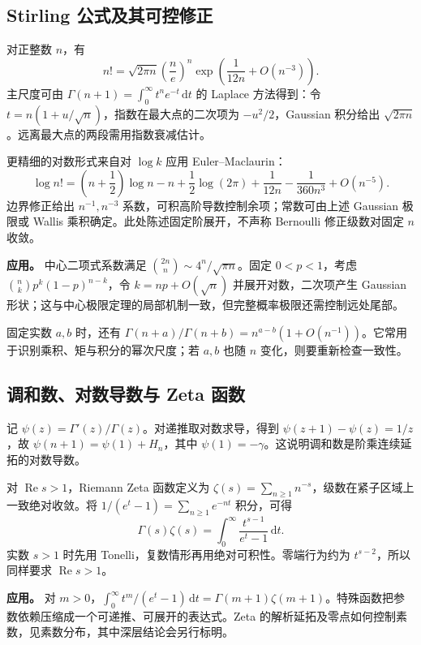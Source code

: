 \documentclass[12pt,fontset=fandol]{ctexart}
\begin{document}
\subsection{Stirling 公式及其可控修正}

\label{app:special-stirling}

对正整数 $n$，有
\[
n!=\sqrt{2\pi n}\left(\frac ne\right)^n
\exp\!\left(\frac1{12n}+O(n^{-3})\right).
\]
主尺度可由 $\Gamma(n+1)=\int_0^\infty t^ne^{-t}\,\mathrm dt$ 的 Laplace 方法得到：令 $t=n(1+u/\sqrt n)$，指数在最大点的二次项为 $-u^2/2$，Gaussian 积分给出 $\sqrt{2\pi n}$。远离最大点的两段需用指数衰减估计。

更精细的对数形式来自对 $\log k$ 应用 Euler--Maclaurin：
\[
\log n!=\left(n+\frac12\right)\log n-n+\frac12\log(2\pi)
+\frac1{12n}-\frac1{360n^3}+O(n^{-5}).
\]
边界修正给出 $n^{-1},n^{-3}$ 系数，可积高阶导数控制余项；常数可由上述 Gaussian 极限或 Wallis 乘积确定。此处陈述固定阶展开，不声称 Bernoulli 修正级数对固定 $n$ 收敛。

\textbf{应用。} 中心二项式系数满足 $\binom{2n}{n}\sim4^n/\sqrt{\pi n}$。固定 $0<p<1$，考虑 $\binom{n}{k}p^k(1-p)^{n-k}$，令 $k=np+O(\sqrt n)$ 并展开对数，二次项产生 Gaussian 形状；这与中心极限定理的局部机制一致，但完整概率极限还需控制远处尾部。

固定实数 $a,b$ 时，还有 $\Gamma(n+a)/\Gamma(n+b)=n^{a-b}(1+O(n^{-1}))$。它常用于识别乘积、矩与积分的幂次尺度；若 $a,b$ 也随 $n$ 变化，则要重新检查一致性。

\subsection{调和数、对数导数与 Zeta 函数}

\label{app:special-zeta}

记 $\psi(z)=\Gamma'(z)/\Gamma(z)$。对递推取对数求导，得到 $\psi(z+1)-\psi(z)=1/z$，故 $\psi(n+1)=\psi(1)+H_n$，其中 $\psi(1)=-\gamma$。这说明调和数是阶乘连续延拓的对数导数。

对 $\operatorname{Re}s>1$，Riemann Zeta 函数定义为 $\zeta(s)=\sum_{n\geq1}n^{-s}$，级数在紧子区域上一致绝对收敛。将 $1/(e^t-1)=\sum_{n\geq1}e^{-nt}$ 积分，可得
\[
\Gamma(s)\zeta(s)=\int_0^\infty\frac{t^{s-1}}{e^t-1}\,\mathrm dt.
\]
实数 $s>1$ 时先用 Tonelli，复数情形再用绝对可积性。零端行为约为 $t^{s-2}$，所以同样要求 $\operatorname{Re}s>1$。

\textbf{应用。} 对 $m>0$，$\int_0^\infty t^m/(e^t-1)\,\mathrm dt=\Gamma(m+1)\zeta(m+1)$。特殊函数把参数依赖压缩成一个可递推、可展开的表达式。Zeta 的解析延拓及零点如何控制素数，见素数分布，其中深层结论会另行标明。
\end{document}
